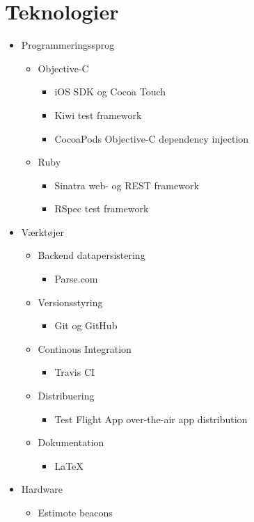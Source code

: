 \chapter{Teknologier}
\label{ch:teknologier}

\begin{itemize}
\item Programmeringssprog
	\begin{itemize}
		\item Objective-C
			\begin{itemize}
				\item iOS SDK og Cocoa Touch
				\item Kiwi test framework
				\item CocoaPods Objective-C dependency injection
			\end{itemize}
		
		\item Ruby
			\begin{itemize}
				\item Sinatra web- og REST framework
				\item RSpec test framework
			\end{itemize}
	\end{itemize}
\item Værktøjer
	\begin{itemize}
		\item Backend datapersistering
			\begin{itemize}
				\item Parse.com
			\end{itemize}
		
		\item Versionsstyring
			\begin{itemize}
				\item Git og GitHub
			\end{itemize}
		
		\item Continous Integration
			\begin{itemize}
				\item Travis CI
			\end{itemize}
		
		\item Distribuering
			\begin{itemize}
				\item Test Flight App over-the-air app distribution
			\end{itemize}
		
		\item Dokumentation
			\begin{itemize}
				\item{LaTeX}
			\end{itemize}
	\end{itemize}
\item Hardware
	\begin{itemize}
		\item Estimote beacons
	\end{itemize}
	\end{itemize}